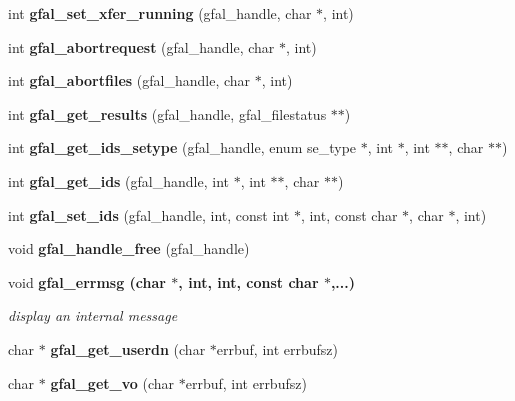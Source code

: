 \begin{CompactItemize}
\item 
int \textbf{gfal\_\-set\_\-xfer\_\-running} (gfal\_\-handle, char $\ast$, int)\label{gfal__common_8h_e907a676c77e646e5a878e1db1fdcd96}

\item 
int \textbf{gfal\_\-abortrequest} (gfal\_\-handle, char $\ast$, int)\label{gfal__common_8h_c38428bec7d99cd8e97f8c2cecb02c26}

\item 
int \textbf{gfal\_\-abortfiles} (gfal\_\-handle, char $\ast$, int)\label{gfal__common_8h_492b7ad68bbcc21f29a4f7de5787bd58}

\item 
int \textbf{gfal\_\-get\_\-results} (gfal\_\-handle, gfal\_\-filestatus $\ast$$\ast$)\label{gfal__common_8h_eae3f1d564f4e403597f5024c3d2d606}

\item 
int \textbf{gfal\_\-get\_\-ids\_\-setype} (gfal\_\-handle, enum se\_\-type $\ast$, int $\ast$, int $\ast$$\ast$, char $\ast$$\ast$)\label{gfal__common_8h_2bed7d372296a8d43282cea69ccb663e}

\item 
int \textbf{gfal\_\-get\_\-ids} (gfal\_\-handle, int $\ast$, int $\ast$$\ast$, char $\ast$$\ast$)\label{gfal__common_8h_72418d9d0374b8beca6fca284a8e5db2}

\item 
int \textbf{gfal\_\-set\_\-ids} (gfal\_\-handle, int, const int $\ast$, int, const char $\ast$, char $\ast$, int)\label{gfal__common_8h_5da8c01443270bf26cb6f60fe1457c53}

\item 
void \textbf{gfal\_\-handle\_\-free} (gfal\_\-handle)\label{gfal__common_8h_a21bc6b4163400d28590637b474a1b05}

\item 
void \bf{gfal\_\-errmsg} (char $\ast$, int, int, const char $\ast$,...)
\begin{CompactList}\small\item\em display an internal message \item\end{CompactList}\item 
char $\ast$ \textbf{gfal\_\-get\_\-userdn} (char $\ast$errbuf, int errbufsz)\label{group__internal__group_g6bd6336b0fee1ff32ad6bc5ef3d96068}

\item 
char $\ast$ \textbf{gfal\_\-get\_\-vo} (char $\ast$errbuf, int errbufsz)\label{group__internal__group_g1d7294ee456d16c8b1bf40f97ffb5081}


\end{CompactItemize}

